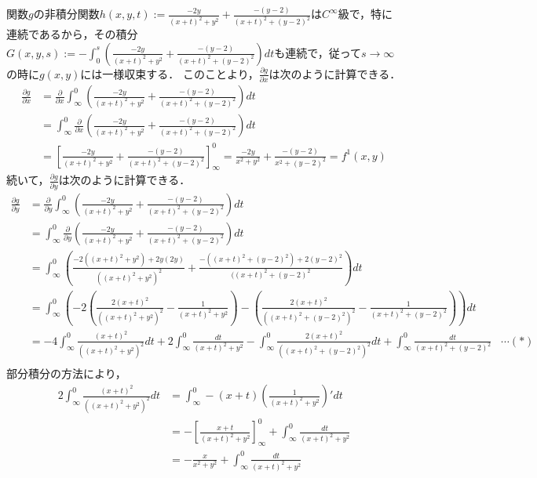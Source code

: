 \documentclass[dvipdfmx,a4paper,uplatex]{jsarticle}
\begin{document}
関数$g$の非積分関数$h(x,y,t):=\frac{-2y}{(x+t)^2+y^2} + \frac{-(y-2)}{(x+t)^2+(y-2)^2}$は$C^\infty$級で，特に連続であるから，その積分$G(x,y,s):=-\int^s_0\left( \frac{-2y}{(x+t)^2+y^2} + \frac{-(y-2)}{(x+t)^2+(y-2)^2} \right)dt$も連続で，従って$s\to\infty$の時に$g(x,y)$には一様収束する．
このことより，$\frac{\partial g}{\partial x}$は次のように計算できる．
\begin{align*}
    \frac{\partial g}{\partial x} &= \frac{\partial}{\partial x}\int^0_\infty \left( \frac{-2y}{(x+t)^2+y^2} + \frac{-(y-2)}{(x+t)^2+(y-2)^2} \right)dt\\
    &= \int^0_\infty \frac{\partial}{\partial x}\left( \frac{-2y}{(x+t)^2+y^2} + \frac{-(y-2)}{(x+t)^2+(y-2)^2} \right)dt\\
    &= \left[ \frac{-2y}{(x+t)^2+y^2} + \frac{-(y-2)}{(x+t)^2+(y-2)^2} \right]^0_\infty = \frac{-2y}{x^2+y^2}+\frac{-(y-2)}{x^2+(y-2)^2} = f^1(x,y)
\end{align*}
続いて，$\frac{\partial g}{\partial y}$は次のように計算できる．
\begin{align*}
    \frac{\partial g}{\partial y} &= \frac{\partial}{\partial y}\int^0_\infty \left( \frac{-2y}{(x+t)^2+y^2} + \frac{-(y-2)}{(x+t)^2+(y-2)^2} \right)dt\\
    &= \int^0_\infty \frac{\partial}{\partial y}\left( \frac{-2y}{(x+t)^2+y^2} + \frac{-(y-2)}{(x+t)^2+(y-2)^2} \right)dt\\
    &= \int^0_\infty \left( \frac{-2((x+t)^2+y^2)+2y(2y)}{((x+t)^2+y^2)^2}+\frac{-((x+t)^2+(y-2)^2)+2(y-2)^2}{((x+t)^2+(y-2)^2} \right)dt \\
    &= \int^0_\infty \left( -2\left( \frac{2(x+t)^2}{((x+t)^2+y^2)^2}-\frac{1}{(x+t)^2+y^2} \right) - \left( \frac{2(x+t)^2}{((x+t)^2+(y-2)^2)^2}-\frac{1}{(x+t)^2+(y-2)^2}\right) \right)dt\\
    &= -4\int^0_\infty\frac{(x+t)^2}{((x+t)^2+y^2)^2}dt + 2\int^0_\infty\frac{dt}{(x+t)^2+y^2}-\int^0_\infty\frac{2(x+t)^2}{((x+t)^2+(y-2)^2)^2}dt+\int^0_\infty\frac{dt}{(x+t)^2+(y-2)^2}\;\;\;\cdots(\ast)\\
\end{align*}
部分積分の方法により，
\begin{align*}
    2\int^0_\infty\frac{(x+t)^2}{((x+t)^2+y^2)^2}dt &= \int^0_\infty -(x+t)\left(\frac{1}{(x+t)^2+y^2}\right)'dt\\
    &= -\left[\frac{x+t}{(x+t)^2+y^2} \right]^0_\infty + \int^0_\infty\frac{dt}{(x+t)^2+y^2}\\
    &= -\frac{x}{x^2+y^2} + \int^0_\infty\frac{dt}{(x+t)^2+y^2}
\end{align*}
\end{document}
